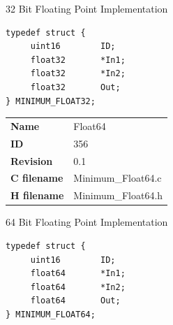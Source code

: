 32 Bit Floating Point Implementation

\begin{lstlisting}
typedef struct {
     uint16        ID;
     float32       *In1;
     float32       *In2;
     float32       Out;
} MINIMUM_FLOAT32;
\end{lstlisting}

\ifdefined \AddTestReports
{}
\fi
{}
\nopagebreak[0]
\begin{tabular}{l l}
\textbf{Name} & Float64 \tabularnewline
\textbf{ID} & 356 \tabularnewline
\textbf{Revision} & 0.1 \tabularnewline
\textbf{C filename} & Minimum\_Float64.c \tabularnewline
\textbf{H filename} & Minimum\_Float64.h \tabularnewline
\end{tabular}
\vspace{1ex}

64 Bit Floating Point Implementation

\begin{lstlisting}
typedef struct {
     uint16        ID;
     float64       *In1;
     float64       *In2;
     float64       Out;
} MINIMUM_FLOAT64;
\end{lstlisting}

\ifdefined \AddTestReports
{}
\fi
